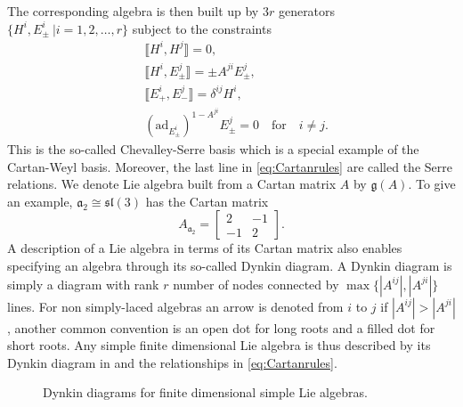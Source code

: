 \documentclass[11pt]{report}
\begin{document}
The corresponding algebra is then built up by $3r$ generators $\{H^i,E_{\pm}^i\ |i=1,2,\ldots,r\}$ subject to the constraints
\begin{equation}
\begin{aligned}\label{eq:Cartanrules}
    &\llbracket H^i,H^j\rrbracket = 0,\\
    &\llbracket H^i,E_{\pm}^j\rrbracket = \pm A^{ji}E_{\pm}^{j},\\
    &\llbracket E_+^i,E_-^j\rrbracket = \delta^{ij}H^i,\\
    &(\text{ad}_{E_{\pm}^i})^{1-A^{ji}}E^j_\pm = 0 \quad \text{for} \quad i\neq j.
\end{aligned}
\end{equation}
This is the so-called Chevalley-Serre basis which is a special example of the Cartan-Weyl basis. Moreover, the last line in \eqref{eq:Cartanrules} are called the Serre relations. We denote Lie algebra built from a Cartan matrix $A$ by $\mathfrak{g}(A)$. To give an example, $\mathfrak{a}_2\cong \mathfrak{sl}(3)$ has the Cartan matrix
\begin{equation}
    A_\mathfrak{a_2}=\begin{bmatrix}2&-1\\-1&2\end{bmatrix}.
\end{equation}
A description of a Lie algebra in terms of its Cartan matrix also enables specifying an algebra through its so-called Dynkin diagram. A Dynkin diagram is simply a diagram with rank $r$ number of nodes connected by $\max\{|A^{ij}|,|A^{ji}|\}$ lines. For non simply-laced algebras an arrow is denoted from $i$ to $j$ if $|A^{ij}|>|A^{ji}|$, another common convention is an open dot for long roots and a filled dot for short roots. Any simple finite dimensional Lie algebra is thus described by its Dynkin diagram in  and the relationships in \eqref{eq:Cartanrules}.
\begin{figure}
    \centering
    \AllDynkin
    \caption{Dynkin diagrams for finite dimensional simple Lie algebras.}
    \label{fig:AllDynkin}
\end{figure}
\end{document}
